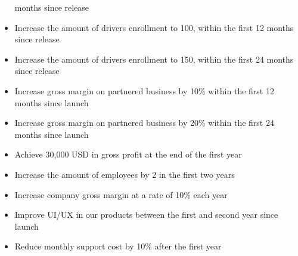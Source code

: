 \begin{itemize}
    months since release
    \item Increase the amount of drivers enrollment to 100, within the first 
    12 months since release
    \item Increase the amount of drivers enrollment to 150, within the first 
    24 months since release
    \item Increase gross margin on partnered business by 10\% within the first 
    12 months since launch
    \item Increase gross margin on partnered business by 20\% within the first 
    24 months since launch
    \item Achieve 30,000 USD in gross profit at the end of the first year
    \item Increase the amount of employees by 2 in the first two years
    \item Increase company gross margin at a rate of 10\% each year
    \item Improve UI/UX in our products between the first and second year 
    since launch
    \item Reduce monthly support cost by 10\% after the first year
\end{itemize}